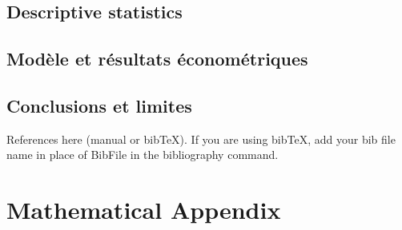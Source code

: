 \documentclass[AEJ]{AEA}
\begin{document}
\subsection{Descriptive statistics}
\subsection{Modèle et résultats économétriques}
\subsection{Conclusions et limites}





References here (manual or bibTeX). If you are using bibTeX, add your bib file 
name in place of BibFile in the bibliography command.



\appendix

\section{Mathematical Appendix}
\end{document}
